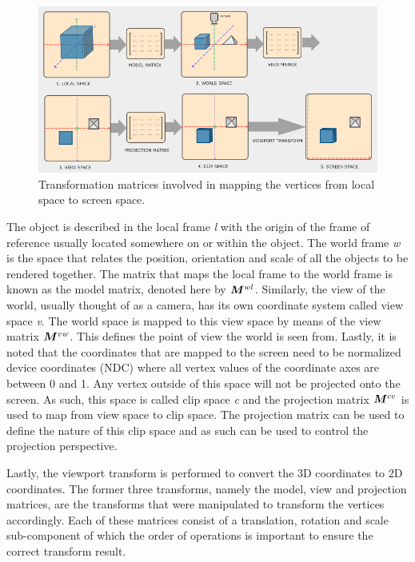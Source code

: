 
\begin{figure}[!ht]
	\centering
	\includegraphics[width=1\linewidth]{figures/transformation-matrices.PNG}
	\caption{Transformation matrices involved in mapping the vertices from local space to screen space.}
	\label{fig:transformation-matrices}
\end{figure}

The object is described in the local frame \textit{l} with the origin of the frame of reference usually located somewhere on or within the object. The world frame \textit{w} is the space  that relates the position, orientation and scale of all the objects to be rendered together. The matrix that maps the local frame to the world frame is known as the model matrix, denoted here by $\bm{M}^{wl}$. Similarly, the view of the world, usually thought of as a camera, has its own coordinate system called view space \textit{v}. The world space is mapped to this view space by means of the view matrix $\bm{M}^{vw}$. This defines the point of view the world is seen from. Lastly, it is noted that the coordinates that are mapped to the screen need to be normalized device coordinates (NDC) where all vertex values of the coordinate axes are between 0 and 1. Any vertex outside of this space will not be projected onto the screen. As such, this space is called clip space \textit{c} and the projection matrix $\bm{M}^{cv}$ is used to map from view space to clip space. The projection matrix can be used to define the nature of this clip space and as such can be used to control the projection perspective. 

Lastly, the viewport transform is performed to convert the 3D coordinates to 2D coordinates. The former three transforms, namely the model, view and projection matrices, are the transforms that were manipulated to transform the vertices accordingly. Each of these matrices consist of a translation, rotation and scale sub-component of which the order of operations is important to ensure the correct transform result.


